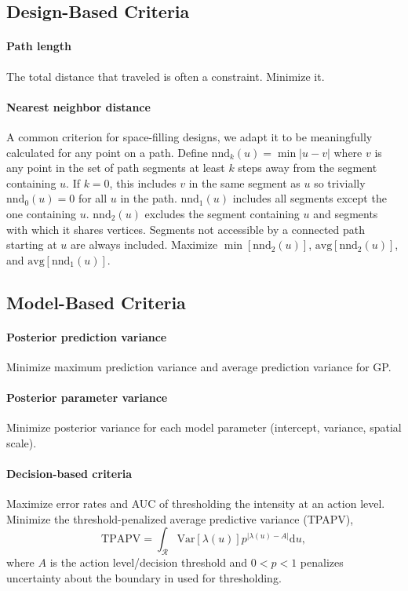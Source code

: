 \documentclass[review]{elsarticle}
\begin{document}
\subsection{Design-Based Criteria}

\paragraph{Path length}
The total distance that traveled is often a constraint. Minimize it.

\paragraph{Nearest neighbor distance}
A common criterion for space-filling designs, we adapt it to be meaningfully
calculated for any point on a path. Define
\(\mathrm{nnd}_{k}(u) = \min|u - v|\) where \(v\) is any point in the set of
path segments at least \(k\) steps away from the segment containing \(u\). If
\(k = 0\), this includes \(v\) in the same segment as \(u\) so trivially
\(\mathrm{nnd}_{0}(u) = 0\) for all \(u\) in the path. \(\mathrm{nnd}_{1}(u)\)
includes all segments except the one containing \(u\). \(\mathrm{nnd}_{2}(u)\)
excludes the segment containing \(u\) and segments with which it shares
vertices. Segments not accessible by a connected path starting at \(u\) are
always included. Maximize \(\min[\mathrm{nnd}_{2}(u)]\),
\(\mathrm{avg}[\mathrm{nnd}_{2}(u)]\), and
\(\mathrm{avg}[\mathrm{nnd}_{1}(u)]\).


\subsection{Model-Based Criteria}

\paragraph{Posterior prediction variance}
Minimize maximum prediction variance and average prediction variance for GP.

\paragraph{Posterior parameter variance}
Minimize posterior variance for each model parameter (intercept, variance,
spatial scale).

\paragraph{Decision-based criteria}
Maximize error rates and AUC of thresholding the intensity at an action level.
Minimize the threshold-penalized average predictive variance (TPAPV),
\begin{equation*}
\mathrm{TPAPV} = \int_{\mathcal{R}} \mathrm{Var}\left[\lambda(u)\right]
p^{\left|\lambda(u)-A\right|} \mathrm{d}u,
\end{equation*}
where \(A\) is the action level/decision threshold and \(0 < p < 1\) penalizes
uncertainty about the boundary in used for thresholding.
\end{document}
